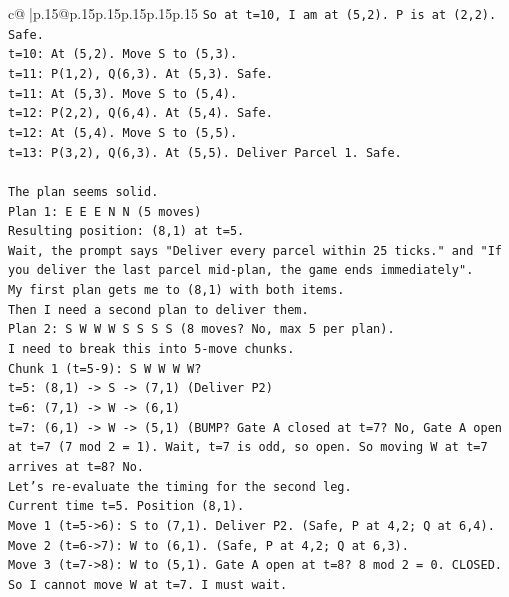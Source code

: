 \documentclass{article}
\begin{document}
{\begin{supertabular}{c@{$\;$}|p{.15\linewidth}@{}p{.15\linewidth}p{.15\linewidth}p{.15\linewidth}p{.15\linewidth}p{.15\linewidth}}
{{{\texttt{So at t=10, I am at (5,2). P is at (2,2). Safe.} \\
\texttt{t=10: At (5,2). Move S to (5,3).} \\
\texttt{t=11: P(1,2), Q(6,3). At (5,3). Safe.} \\
\texttt{t=11: At (5,3). Move S to (5,4).} \\
\texttt{t=12: P(2,2), Q(6,4). At (5,4). Safe.} \\
\texttt{t=12: At (5,4). Move S to (5,5).} \\
\texttt{t=13: P(3,2), Q(6,3). At (5,5). Deliver Parcel 1. Safe.} \\
\\ 
\texttt{The plan seems solid.} \\
\texttt{Plan 1: E E E N N (5 moves)} \\
\texttt{Resulting position: (8,1) at t=5.} \\
\texttt{Wait, the prompt says "Deliver every parcel within 25 ticks." and "If you deliver the last parcel mid{-}plan, the game ends immediately".} \\
\texttt{My first plan gets me to (8,1) with both items.} \\
\texttt{Then I need a second plan to deliver them.} \\
\texttt{Plan 2: S W W W S S S S (8 moves? No, max 5 per plan).} \\
\texttt{I need to break this into 5{-}move chunks.} \\
\texttt{Chunk 1 (t=5{-}9): S W W W W?} \\
\texttt{t=5: (8,1) {-}> S {-}> (7,1) (Deliver P2)} \\
\texttt{t=6: (7,1) {-}> W {-}> (6,1)} \\
\texttt{t=7: (6,1) {-}> W {-}> (5,1) (BUMP? Gate A closed at t=7? No, Gate A open at t=7 (7 mod 2 = 1). Wait, t=7 is odd, so open. So moving W at t=7 arrives at t=8? No.} \\
\texttt{Let's re{-}evaluate the timing for the second leg.} \\
\texttt{Current time t=5. Position (8,1).} \\
\texttt{Move 1 (t=5{-}>6): S to (7,1). Deliver P2. (Safe, P at 4,2; Q at 6,4).} \\
\texttt{Move 2 (t=6{-}>7): W to (6,1). (Safe, P at 4,2; Q at 6,3).} \\
\texttt{Move 3 (t=7{-}>8): W to (5,1). Gate A open at t=8? 8 mod 2 = 0. CLOSED.} \\
\texttt{So I cannot move W at t=7. I must wait.} \\
}}}
\end{supertabular}}
\end{document}
